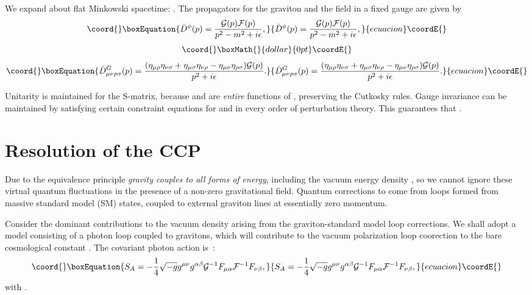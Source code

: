 \documentclass[a4paper,11pt]{article}
\begin{document}
We expand \coordHE{} about flat Minkowski spacetime:
\coordHE{}. The propagators for the
graviton and the \myHighlight{$\phi$}\coordHE{} field in a fixed gauge are given by
\begin{equation}\coord{}\boxEquation{
{\bar D}^\phi(p)=\frac{{\cal G}(p){\cal F}(p)}{p^2-m^2+i\epsilon},
}{
{\bar D}^\phi(p)=\frac{{\cal G}(p){\cal F}(p)}{p^2-m^2+i\epsilon},
}{ecuacion}\coordE{}\end{equation}
$$\coord{}\boxMath{  }{dollar}{0pt}\coordE{}$$
\begin{equation}\coord{}\boxEquation{
{\bar D}^G_{\mu\nu\rho\sigma}(p)=\frac{(\eta_{\mu\rho}\eta_{\nu\sigma}
+\eta_{\mu\sigma}\eta_{\nu\rho}-\eta_{\mu\nu}\eta_{\rho\sigma})
{\cal G}(p)}{p^2+i\epsilon}.
}{
{\bar D}^G_{\mu\nu\rho\sigma}(p)=\frac{(\eta_{\mu\rho}\eta_{\nu\sigma}
+\eta_{\mu\sigma}\eta_{\nu\rho}-\eta_{\mu\nu}\eta_{\rho\sigma})
{\cal G}(p)}{p^2+i\epsilon}.
}{ecuacion}\coordE{}\end{equation}

Unitarity is maintained for the S-matrix, because \coordHE{} and
\coordHE{} are {\it entire} functions of \coordHE{}, preserving the Cutkosky
rules. Gauge invariance can be maintained by satisfying certain
constraint equations for \coordHE{} and \coordHE{} in every order of
perturbation theory.  This guarantees that \coordHE{}.

\section{\bf Resolution of the CCP}

Due to the equivalence principle {\it gravity couples to all
forms of energy}, including the vacuum energy density \coordHE{}, so we cannot ignore these virtual quantum
fluctuations in the presence of a non-zero gravitational field.
Quantum corrections to \coordHE{} come from loops formed from
massive standard model (SM) states, coupled to external graviton
lines at essentially zero momentum.

Consider the dominant contributions to the vacuum
density arising from the graviton-standard model loop corrections.
We shall adopt a model consisting of a photon loop coupled to
gravitons, which will contribute to the vacuum polarization loop coorection
to the bare cosmological constant \coordHE{}. The covariant photon action
is~\cite{Leibbrandt}:
\begin{equation}\coord{}\boxEquation{
S_A=-\frac{1}{4}\sqrt{-g}g^{\mu\nu}g^{\alpha\beta}{\cal
G}^{-1}F_{\mu\alpha}{\cal F}^{-1}F_{\nu\beta},
}{
S_A=-\frac{1}{4}\sqrt{-g}g^{\mu\nu}g^{\alpha\beta}{\cal
G}^{-1}F_{\mu\alpha}{\cal F}^{-1}F_{\nu\beta},
}{ecuacion}\coordE{}\end{equation} with
\coordHE{}.
\end{document}
